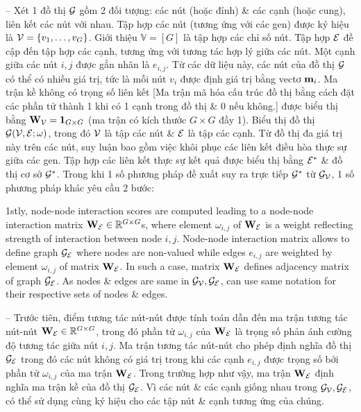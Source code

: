 \documentclass{article}
\begin{document}
\begin{itemize}
\begin{itemize}
        -- Xét 1 đồ thị ${\cal G}$ gồm 2 đối tượng: các nút (hoặc đỉnh) \& các cạnh (hoặc cung), liên kết các nút với nhau. Tập hợp các nút (tương ứng với các gen) được ký hiệu là ${\cal V} = \{v_1,\ldots,v_G\}$. Giới thiệu $\mathbb{V} = [G]$ là tập hợp các chỉ số nút. Tập hợp ${\cal E}$ đề cập đến tập hợp các cạnh, tương ứng với tương tác hợp lý giữa các nút. Một cạnh giữa các nút $i,j$ được gắn nhãn là $e_{i,j}$. Từ các dữ liệu này, các nút của đồ thị ${\cal G}$ có thể có nhiều giá trị, tức là mỗi nút $v_i$ được định giá trị bằng vectơ ${\bf m}_i$. Ma trận kề không có trọng số liên kết [Ma trận mã hóa cấu trúc đồ thị bằng cách đặt các phần tử thành 1 khi có 1 cạnh trong đồ thị \& 0 nếu không.] được biểu thị bằng ${\bf W}_{\cal V} = {\bf1}_{G\times G}$ (ma trận có kích thước $G\times G$ đầy 1). Biểu thị đồ thị ${\cal G}({\cal V},{\cal E};\omega)$, trong đó ${\cal V}$ là tập các nút \& ${\cal E}$ là tập các cạnh. Từ đồ thị đa giá trị này trên các nút, suy luận bao gồm việc khôi phục các liên kết điều hòa thực sự giữa các gen. Tập hợp các liên kết thực sự kết quả được biểu thị bằng ${\cal E}^*$ \& đồ thị cơ sở ${\cal G}^*$. Trong khi 1 số phương pháp đề xuất suy ra trực tiếp ${\cal G}^*$ từ $\cal G_V$, 1 số phương pháp khác yêu cầu 2 bước:
        
        1stly, node-node interaction scores are computed leading to a node-node interaction matrix ${\bf W}_{\cal E}\in\mathbb{R}^{G\times G}$s, where element $\omega_{i,j}$ of ${\bf W}_{\cal E}$ is a weight reflecting strength of interaction between node $i,j$. Node-node interaction matrix allows to define graph $\cal G_E$ where nodes are non-valued while edges $e_{i,j}$ are weighted by element $\omega_{i,j}$ of matrix ${\bf W}_{\cal E}$. In such a case, matrix ${\bf W}_{\cal E}$ defines adjacency matrix of graph $\cal G_E$. As nodes \& edges are same in $\cal G_V,G_E$, can use same notation for their respective sets of nodes \& edges.
        
        -- Trước tiên, điểm tương tác nút-nút được tính toán dẫn đến ma trận tương tác nút-nút ${\bf W}_{\cal E}\in\mathbb{R}^{G\times G}$, trong đó phần tử $\omega_{i,j}$ của ${\bf W}_{\cal E}$ là trọng số phản ánh cường độ tương tác giữa nút $i,j$. Ma trận tương tác nút-nút cho phép định nghĩa đồ thị $\cal G_E$ trong đó các nút không có giá trị trong khi các cạnh $e_{i,j}$ được trọng số bởi phần tử $\omega_{i,j}$ của ma trận ${\bf W}_{\cal E}$. Trong trường hợp như vậy, ma trận ${\bf W}_{\cal E}$ định nghĩa ma trận kề của đồ thị $\cal G_E$. Vì các nút \& các cạnh giống nhau trong $\cal G_V,G_E$, có thể sử dụng cùng ký hiệu cho các tập nút \& cạnh tương ứng của chúng.
        

\end{itemize}
\end{itemize}
\end{document}
